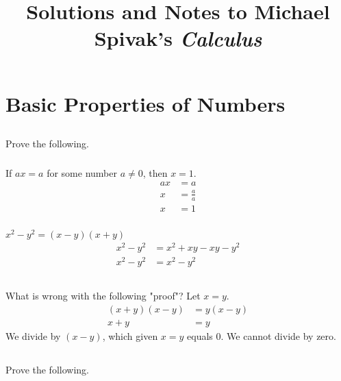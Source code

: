 \documentclass[12pt]{article}
\begin{document}
\title{Solutions and Notes to Michael Spivak's \emph{Calculus}}
\author{}
\date{}
\maketitle
\cleardoublepage

\section{Basic Properties of Numbers}
\subsection{}
Prove the following.
\subsubsection{}
If $ax=a$ for some number $ a\neq 0$, then $x=1$.
\begin{equation*}
\begin{split}
ax&=a\\ 
x&=\frac{a}{a}\\
x&=1
\end{split}
\end{equation*}
\subsubsection{}
$x^2-y^2=(x-y)(x+y)$
\begin{equation*}
\begin{split}
x^2 - y^2 &= x^2 + xy - xy - y^2\\ 
x^2 - y^2 &= x^2 - y^2
\end{split}
\end{equation*}

\subsection{}
What is wrong with the following "proof"? Let $x=y$.
\begin{equation*}
\begin{split}
(x+y)(x-y) &= y(x-y)\\ 
x + y &= y
\end{split}
\end{equation*}
We divide by $(x-y)$, which given $x=y$ equals $0$. We cannot divide by zero.

\subsection{}
Prove the following.
\end{document}
